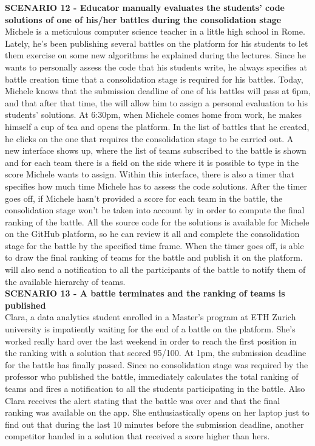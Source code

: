     \textbf{SCENARIO 12 - Educator manually evaluates the students' code solutions of one of his/her battles during the consolidation stage}\\
    Michele is a meticulous computer science teacher in a little high school in Rome. Lately, he's been publishing several battles on the \app platform for his students to let them exercise on some new algorithms he explained during the lectures. Since he wants to personally assess the code that his students write, he always specifies at battle creation time that a consolidation stage is required for his battles. Today, Michele knows that the submission deadline of one of his battles will pass at 6pm, and that after that time, the \app will allow him to assign a personal evaluation to his students' solutions. At 6:30pm, when Michele comes home from work, he makes himself a cup of tea and opens the \app platform. In the list of battles that he created, he clicks on the one that requires the consolidation stage to be carried out. A new interface shows up, where the list of teams subscribed to the battle is shown and for each team there is a field on the side where it is possible to type in the score Michele wants to assign. Within this interface, there is also a timer that specifies how much time Michele has to assess the code solutions. After the timer goes off, if Michele hasn't provided a score for each team in the battle, the consolidation stage won't be taken into account by \app in order to compute the final ranking of the battle.
    All the source code for the solutions is available for Michele on the GitHub platform, so he can review it all and complete the consolidation stage for the battle by the specified time frame.
    When the timer goes off, \app is able to draw the final ranking of teams for the battle and publish it on the platform. \app will also send a notification to all the participants of the battle to notify them of the available hierarchy of teams.\\

	\textbf{SCENARIO 13 - A battle terminates and the ranking of teams is published}\\
	Clara, a data analytics student enrolled in a Master's program at ETH Zurich university is impatiently waiting for the end of a battle on the \app platform. She's worked really hard over the last weekend in order to reach the first position in the ranking with a solution that scored 95/100. At 1pm, the submission deadline for the battle has finally passed. Since no consolidation stage was required by the professor who published the battle, \app immediately calculates the total ranking of teams and fires a notification to all the students participating in the battle. Also Clara receives the alert stating that the battle was over and that the final ranking was available on the app. She enthusiastically opens \app on her laptop just to find out that during the last 10 minutes before the submission deadline, another competitor handed in a solution that received a score higher than hers.\\ 


